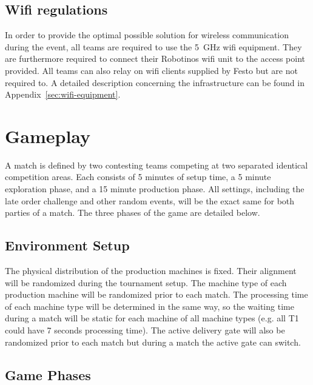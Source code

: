 \documentclass[12pt,twoside]{article}
\begin{document}
\subsection{Wifi regulations}
\label{sec:wifi-regulations}
In order to provide the optimal possible solution for wireless
communication during the event, all teams are required to use the
\SI{5}{\giga\hertz} wifi equipment. They are furthermore required to
connect their Robotinos wifi unit to the access point provided. All
teams can also relay on wifi clients supplied by Festo but are not
required to. A detailed description concerning the infrastructure can
be found in Appendix~\ref{sec:wifi-equipment}.



\section{Gameplay}
A match is defined by two contesting teams competing at two separated
identical competition areas. Each consists of 5 minutes of setup time,
a 5 minute exploration phase, and a 15 minute production phase. All
settings, including the late order challenge and other random events,
will be the exact same for both parties of a match. The three phases
of the game are detailed below.

\subsection{Environment Setup}
\label{sec:}

The physical distribution of the production machines is fixed. Their
alignment will be randomized during the tournament setup. The machine type of each production
machine will be randomized prior to each match. The processing time of
each machine type will be determined in the same way, so the waiting
time during a match will be static for each machine of all machine types
(e.g. all T1 could have 7 seconds processing time). The
active delivery gate will also be randomized prior to each match but
during a match the active gate can switch.

\subsection{Game Phases}
\label{sec:game-phases}
\end{document}

